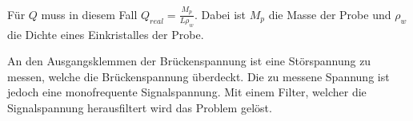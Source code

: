 Für $Q$ muss in diesem Fall $Q_{real} = \frac{M_p}{L \rho_w}$. Dabei ist $M_p$ die Masse der Probe und $\rho_w$ die Dichte
eines Einkristalles der Probe.


An den Ausgangsklemmen der Brückenspannung ist eine Störspannung zu messen, welche die Brückenspannung überdeckt. Die
zu messene Spannung ist jedoch eine monofrequente Signalspannung. Mit einem Filter, welcher die Signalspannung herausfiltert
wird das Problem gelöst.
